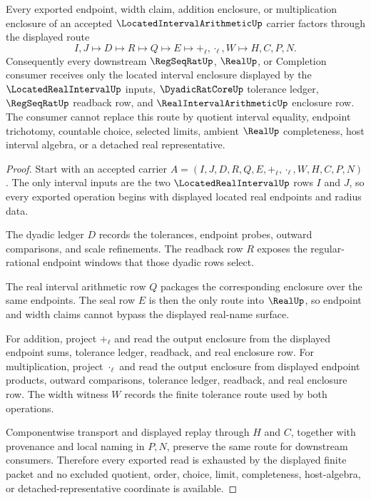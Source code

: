 \begin{theorem}
\label{thm:located-interval-arithmetic-real-seal-nonescape}
Every exported endpoint, width claim, addition enclosure, or multiplication enclosure of an accepted $\LocatedIntervalArithmeticUp$ carrier factors through the displayed route
$$
I,J \longmapsto D \longmapsto R \longmapsto Q \longmapsto E \longmapsto +_\ell,\cdot_\ell,W \longmapsto H,C,P,N .
$$
Consequently every downstream $\RegSeqRatUp$, $\RealUp$, or Completion consumer receives only the located interval enclosure displayed by the $\LocatedRealIntervalUp$ inputs, $\DyadicRatCoreUp$ tolerance ledger, $\RegSeqRatUp$ readback row, and $\RealIntervalArithmeticUp$ enclosure row. The consumer cannot replace this route by quotient interval equality, endpoint trichotomy, countable choice, selected limits, ambient $\RealUp$ completeness, host interval algebra, or a detached real representative.
\end{theorem}
\begin{proof}
Start with an accepted carrier $A=(I,J,D,R,Q,E,+_\ell,\cdot_\ell,W,H,C,P,N)$. The only interval inputs are the two $\LocatedRealIntervalUp$ rows $I$ and $J$, so every exported operation begins with displayed located real endpoints and radius data.

The dyadic ledger $D$ records the tolerances, endpoint probes, outward comparisons, and scale refinements. The readback row $R$ exposes the regular-rational endpoint windows that those dyadic rows select.

The real interval arithmetic row $Q$ packages the corresponding enclosure over the same endpoints. The seal row $E$ is then the only route into $\RealUp$, so endpoint and width claims cannot bypass the displayed real-name surface.

For addition, project $+_\ell$ and read the output enclosure from the displayed endpoint sums, tolerance ledger, readback, and real enclosure row. For multiplication, project $\cdot_\ell$ and read the output enclosure from displayed endpoint products, outward comparisons, tolerance ledger, readback, and real enclosure row. The width witness $W$ records the finite tolerance route used by both operations.

Componentwise transport and displayed replay through $H$ and $C$, together with provenance and local naming in $P,N$, preserve the same route for downstream consumers. Therefore every exported read is exhausted by the displayed finite packet and no excluded quotient, order, choice, limit, completeness, host-algebra, or detached-representative coordinate is available.
\end{proof}

